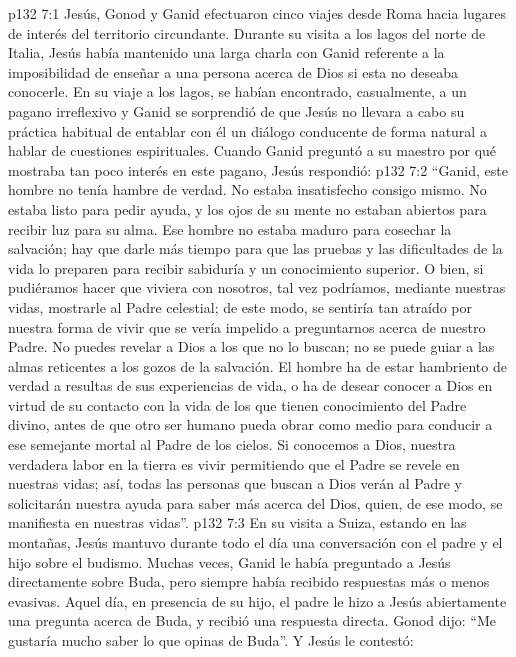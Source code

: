 \vs p132 7:1 Jesús, Gonod y Ganid efectuaron cinco viajes desde Roma hacia lugares de interés del territorio circundante. Durante su visita a los lagos del norte de Italia, Jesús había mantenido una larga charla con Ganid referente a la imposibilidad de enseñar a una persona acerca de Dios si esta no deseaba conocerle. En su viaje a los lagos, se habían encontrado, casualmente, a un pagano irreflexivo y Ganid se sorprendió de que Jesús no llevara a cabo su práctica habitual de entablar con él un diálogo conducente de forma natural a hablar de cuestiones espirituales. Cuando Ganid preguntó a su maestro por qué mostraba tan poco interés en este pagano, Jesús respondió:
\vs p132 7:2 \pc “Ganid, este hombre no tenía hambre de verdad. No estaba insatisfecho consigo mismo. No estaba listo para pedir ayuda, y los ojos de su mente no estaban abiertos para recibir luz para su alma. Ese hombre no estaba maduro para cosechar la salvación; hay que darle más tiempo para que las pruebas y las dificultades de la vida lo preparen para recibir sabiduría y un conocimiento superior. O bien, si pudiéramos hacer que viviera con nosotros, tal vez podríamos, mediante nuestras vidas, mostrarle al Padre celestial; de este modo, se sentiría tan atraído por nuestra forma de vivir que se vería impelido a preguntarnos acerca de nuestro Padre. No puedes revelar a Dios a los que no lo buscan; no se puede guiar a las almas reticentes a los gozos de la salvación. El hombre ha de estar hambriento de verdad a resultas de sus experiencias de vida, o ha de desear conocer a Dios en virtud de su contacto con la vida de los que tienen conocimiento del Padre divino, antes de que otro ser humano pueda obrar como medio para conducir a ese semejante mortal al Padre de los cielos. Si conocemos a Dios, nuestra verdadera labor en la tierra es vivir permitiendo que el Padre se revele en nuestras vidas; así, todas las personas que buscan a Dios verán al Padre y solicitarán nuestra ayuda para saber más acerca del Dios, quien, de ese modo, se manifiesta en nuestras vidas”.
\vs p132 7:3 \pc En su visita a Suiza, estando en las montañas, Jesús mantuvo durante todo el día una conversación con el padre y el hijo sobre el budismo. Muchas veces, Ganid le había preguntado a Jesús directamente sobre Buda, pero siempre había recibido respuestas más o menos evasivas. Aquel día, en presencia de su hijo, el padre le hizo a Jesús abiertamente una pregunta acerca de Buda, y recibió una respuesta directa. Gonod dijo: “Me gustaría mucho saber lo que opinas de Buda”. Y Jesús le contestó:
